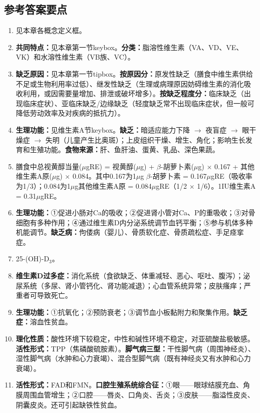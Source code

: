 {\subsection*{参考答案要点}

\begin{enumerate}[leftmargin=*, itemsep=5pt]
    \item 见本章各概念定义框。
    \item \textbf{共同特点：}见本章第一节keybox。\textbf{分类：}脂溶性维生素（VA、VD、VE、VK）和水溶性维生素（VB族、VC）。
    \item \textbf{缺乏原因：}见本章第一节tipbox。\textbf{按原因分：}原发性缺乏（膳食中维生素供给不足或生物利用率过低）、继发性缺乏（生理或病理原因妨碍维生素的消化吸收利用，或因需要量增加、排泄或破坏增多）。\textbf{按缺乏程度分：}临床缺乏（出现临床症状）、亚临床缺乏/边缘缺乏（轻度缺乏常不出现临床症状，但一般可降低劳动效率及对疾病的抵抗力）。
    \item \textbf{生理功能：}见维生素A节keybox。\textbf{缺乏：}暗适应能力下降 $\rightarrow$ 夜盲症 $\rightarrow$ 眼干燥症 $\rightarrow$ 失明（儿童产生比奥斑）；上皮组织干燥、增生、角化；影响生长发育和生殖功能。\textbf{食物来源：}肝、鱼肝油、蛋黄、乳品、深色果蔬。
    \item 膳食中总视黄醇当量($\mu$gRE) = 视黄醇($\mu$g) + $\beta$-胡萝卜素($\mu$g) $\times$ 0.167 + 其他维生素A原($\mu$g) $\times$ 0.084。其中0.167为1$\mu$g $\beta$-胡萝卜素 = 0.167$\mu$gRE（吸收率为1/3）；0.084为1$\mu$g其他维生素A原 = 0.084$\mu$gRE（1/2 $\times$ 1/6）。1IU维生素A = 0.31$\mu$gRE。
    \item \textbf{生理功能：}①促进小肠对Ca的吸收；②促进肾小管对Ca、P的重吸收；③对骨细胞有多种作用；④通过维生素D内分泌系统调节血钙平衡；⑤参与机体多种机能调节。\textbf{缺乏病：}佝偻病（婴儿）、骨质软化症、骨质疏松症、手足痉挛症。
    \item 25-(OH)-D$_3$。
    \item \textbf{维生素D过多症：}消化系统（食欲缺乏、体重减轻、恶心、呕吐、腹泻）；泌尿系统（多尿、肾小管钙化、肾功能减退）；心血管系统异常；皮肤瘙痒；严重者可导致死亡。
    \item \textbf{生理功能：}①抗氧化；②预防衰老；③调节血小板黏附力和聚集作用。\textbf{缺乏症：}溶血性贫血。
    \item \textbf{理化性质：}酸性环境下较稳定，中性和碱性环境不稳定，对亚硫酸盐极敏感。\textbf{活性形式：}TPP（焦磷酸硫胺素）。\textbf{脚气病三型：}干性脚气病（周围神经炎）、湿性脚气病（水肿和心力衰竭）、混合型脚气病（既有神经炎又有水肿和心力衰竭）。
    \item \textbf{活性形式：}FAD和FMN。\textbf{口腔生殖系统综合征：}①眼——眼球结膜充血、角膜周围血管增生；②口腔——唇炎、口角炎、舌炎；③皮肤——脂溢性皮炎、阴囊皮炎。还可引起缺铁性贫血。

\end{enumerate}}
